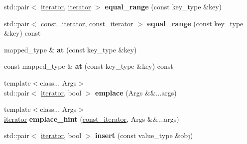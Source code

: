 \begin{DoxyCompactItemize}
\item 
std\+::pair$<$ \hyperlink{classspp___1_1_two__d__iterator}{iterator}, \hyperlink{classspp___1_1_two__d__iterator}{iterator} $>$ {\bfseries equal\+\_\+range} (const key\+\_\+type \&key)\hypertarget{classspp___1_1sparse__hash__map_ac435665dee62af05dcf5fef40ab83672}{}\label{classspp___1_1sparse__hash__map_ac435665dee62af05dcf5fef40ab83672}

\item 
std\+::pair$<$ \hyperlink{classspp___1_1_two__d__iterator}{const\+\_\+iterator}, \hyperlink{classspp___1_1_two__d__iterator}{const\+\_\+iterator} $>$ {\bfseries equal\+\_\+range} (const key\+\_\+type \&key) const \hypertarget{classspp___1_1sparse__hash__map_ab1a65006d9e449697c61c443193ae32b}{}\label{classspp___1_1sparse__hash__map_ab1a65006d9e449697c61c443193ae32b}

\item 
mapped\+\_\+type \& {\bfseries at} (const key\+\_\+type \&key)\hypertarget{classspp___1_1sparse__hash__map_a8c57dd60e35a42646b7d1eaddc804874}{}\label{classspp___1_1sparse__hash__map_a8c57dd60e35a42646b7d1eaddc804874}

\item 
const mapped\+\_\+type \& {\bfseries at} (const key\+\_\+type \&key) const \hypertarget{classspp___1_1sparse__hash__map_a7c03724dbd3fd54ee067cf4d7e376a05}{}\label{classspp___1_1sparse__hash__map_a7c03724dbd3fd54ee067cf4d7e376a05}

\item 
{\footnotesize template$<$class... Args$>$ }\\std\+::pair$<$ \hyperlink{classspp___1_1_two__d__iterator}{iterator}, bool $>$ {\bfseries emplace} (Args \&\&...args)\hypertarget{classspp___1_1sparse__hash__map_ab52c284f93d55d7fde4b0436d56f585a}{}\label{classspp___1_1sparse__hash__map_ab52c284f93d55d7fde4b0436d56f585a}

\item 
{\footnotesize template$<$class... Args$>$ }\\\hyperlink{classspp___1_1_two__d__iterator}{iterator} {\bfseries emplace\+\_\+hint} (\hyperlink{classspp___1_1_two__d__iterator}{const\+\_\+iterator}, Args \&\&...args)\hypertarget{classspp___1_1sparse__hash__map_aa59b119d2e0d26440ee5a153087b8d8d}{}\label{classspp___1_1sparse__hash__map_aa59b119d2e0d26440ee5a153087b8d8d}

\item 
std\+::pair$<$ \hyperlink{classspp___1_1_two__d__iterator}{iterator}, bool $>$ {\bfseries insert} (const value\+\_\+type \&obj)\hypertarget{classspp___1_1sparse__hash__map_ad99f65ae769e4a2de0eb72a479770bd6}{}\label{classspp___1_1sparse__hash__map_ad99f65ae769e4a2de0eb72a479770bd6}


\end{DoxyCompactItemize}
